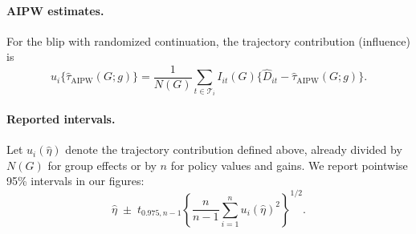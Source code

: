 \paragraph{AIPW estimates.}
For the blip with randomized continuation, the trajectory contribution (influence) is
\[
 u_i\{\widehat\tau_{\mathrm{AIPW}}(G;g)\}
   =\frac{1}{N(G)}
      \sum_{t\in\mathcal T_i} I_{it}(G)
      \bigl\{\widehat D_{it}
             -\widehat\tau_{\mathrm{AIPW}}(G;g)\bigr\}.
\]

\paragraph{Reported intervals.}
Let $u_i(\widehat\eta)$ denote the trajectory contribution defined above,
already divided by $N(G)$ for group effects or by $n$ for policy values and
gains.
We report pointwise 95\% intervals in our figures:
\[
 \widehat\eta
 \;\pm\;
 t_{0.975,n-1}
 \left\{
   \frac{n}{n-1}\sum_{i=1}^n u_i(\widehat\eta)^2
 \right\}^{1/2}.
\]
